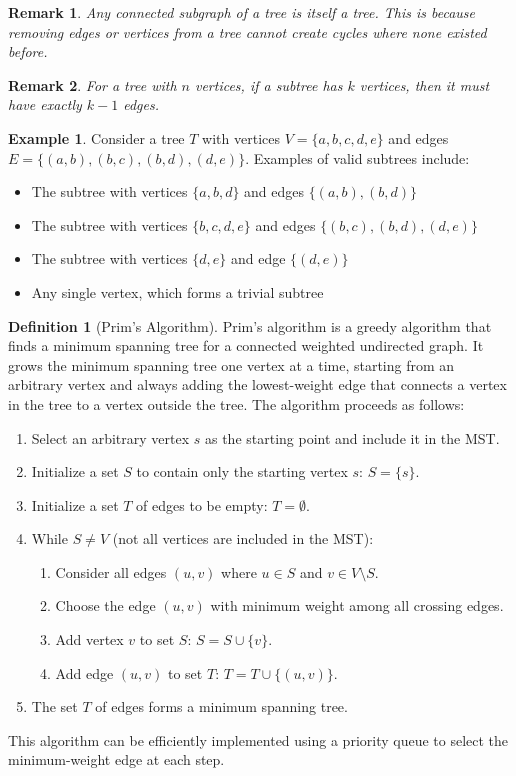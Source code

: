\documentclass{article}
\newtheorem{remark}{Remark}
\theoremstyle{definition}
\newtheorem{example}{Example}
\newtheorem{definition}{Definition}
\begin{document}
\begin{remark}
Any connected subgraph of a tree is itself a tree. This is because removing edges or vertices from a tree cannot create cycles where none existed before.
\end{remark}

\begin{remark}
For a tree with $n$ vertices, if a subtree has $k$ vertices, then it must have exactly $k-1$ edges.
\end{remark}

\begin{example}
Consider a tree $T$ with vertices $V = \{a, b, c, d, e\}$ and edges $E = \{(a,b), (b,c), (b,d), (d,e)\}$. Examples of valid subtrees include:
\begin{itemize}
\item The subtree with vertices $\{a, b, d\}$ and edges $\{(a,b), (b,d)\}$
\item The subtree with vertices $\{b, c, d, e\}$ and edges $\{(b,c), (b,d), (d,e)\}$
\item The subtree with vertices $\{d, e\}$ and edge $\{(d,e)\}$
\item Any single vertex, which forms a trivial subtree
\end{itemize}
\end{example}

\begin{definition}[Prim's Algorithm]
Prim's algorithm is a greedy algorithm that finds a minimum spanning tree for a connected weighted undirected graph. It grows the minimum spanning tree one vertex at a time, starting from an arbitrary vertex and always adding the lowest-weight edge that connects a vertex in the tree to a vertex outside the tree. The algorithm proceeds as follows:
\begin{enumerate}
\item Select an arbitrary vertex $s$ as the starting point and include it in the MST.
\item Initialize a set $S$ to contain only the starting vertex $s$: $S = \{s\}$.
\item Initialize a set $T$ of edges to be empty: $T = \emptyset$.
\item While $S \neq V$ (not all vertices are included in the MST):
   \begin{enumerate}
   \item Consider all edges $(u,v)$ where $u \in S$ and $v \in V \setminus S$.
   \item Choose the edge $(u,v)$ with minimum weight among all crossing edges.
   \item Add vertex $v$ to set $S$: $S = S \cup \{v\}$.
   \item Add edge $(u,v)$ to set $T$: $T = T \cup \{(u,v)\}$.
   \end{enumerate}
\item The set $T$ of edges forms a minimum spanning tree.
\end{enumerate}
This algorithm can be efficiently implemented using a priority queue to select the minimum-weight edge at each step.
\end{definition}
\end{document}

